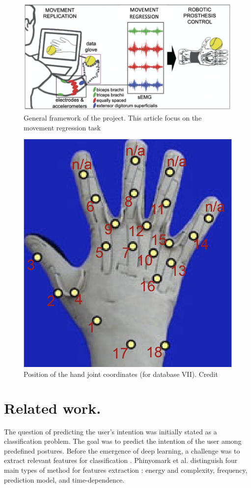 \documentclass[final]{cvpr}
\begin{document}
%
\begin{figure}[t]
	\begin{center}
		\includegraphics[width=0.9\linewidth]{framework}
	\end{center}
	\caption{General framework of the project. This article focus on the movement regression task}
	\label{general_framework}
\end{figure}

\begin{figure}[t]
	\begin{center}
		\includegraphics[width=0.5\linewidth]{hand.png}
	\end{center}
	\caption{Position of the hand joint coordinates (for database VII). Credit \cite{Krasoulis2017}}
	\label{hand}
\end{figure}


\section{Related work.}
The question of predicting the user's intention was initially stated as a classification problem. The goal was to predict the intention of the user among predefined postures. Before the emergence of deep learning, a challenge was to extract relevant features for classification \cite{Features_extraction}. Phinyomark et al. distinguish four main types of method for features extraction : energy and complexity, frequency, prediction model, and time-dependence. \\
\end{document}
